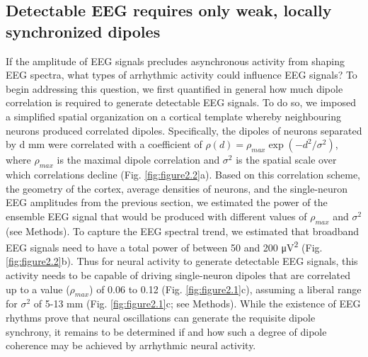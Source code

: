 \subsection{Detectable EEG requires only weak, locally synchronized dipoles}
If the amplitude of EEG signals precludes asynchronous activity from shaping EEG spectra, what types of arrhythmic activity could influence EEG signals? To begin addressing this question, we first quantified in general how much dipole correlation is required to generate detectable EEG signals. To do so, we imposed a simplified spatial organization on a cortical template whereby neighbouring neurons produced correlated dipoles. Specifically, the dipoles of neurons separated by d \unit{\milli\meter} were correlated with a coefficient of $\rho(d)=\rho_{max}\exp{(-d^2/\sigma^2)}$, where $\rho_{max}$ is the maximal dipole correlation and $\sigma^2$ is the spatial scale over which correlations decline (Fig. \ref{fig:figure2.2}a). Based on this correlation scheme, the geometry of the cortex, average densities of neurons, and the single-neuron EEG amplitudes from the previous section, we estimated the power of the ensemble EEG signal that would be produced with different values of $\rho_{max}$ and $\sigma^2$ (see Methods). To capture the EEG spectral trend, we estimated that broadband EEG signals need to have a total power of between 50 and 200 \unit{\micro\volt\squared} (Fig. \ref{fig:figure2.2}b). Thus for neural activity to generate detectable EEG signals, this activity needs to be capable of driving single-neuron dipoles that are correlated up to a value ($\rho_{max}$) of 0.06 to 0.12 (Fig. \ref{fig:figure2.1}c), assuming a liberal range for $\sigma^2$ of 5-13 \unit{\milli\meter} (Fig. \ref{fig:figure2.1}c; see Methods). While the existence of EEG rhythms prove that neural oscillations can generate the requisite dipole synchrony, it remains to be determined if and how such a degree of dipole coherence may be achieved by arrhythmic neural activity. 

